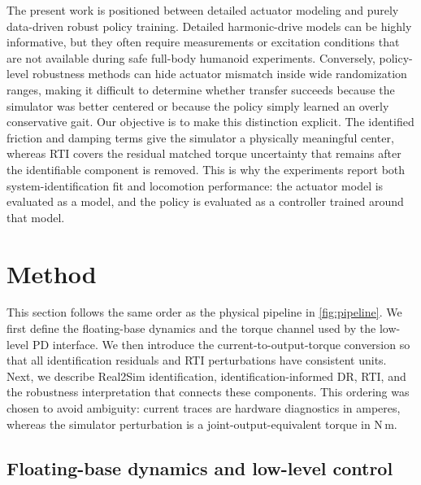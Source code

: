 \documentclass[twoside,final,1p,times]{elsarticle}
\newenvironment{revblock}{}{}
\begin{document}
\begin{revblock}
The present work is positioned between detailed actuator modeling and purely data-driven robust policy training. Detailed harmonic-drive models can be highly informative, but they often require measurements or excitation conditions that are not available during safe full-body humanoid experiments. Conversely, policy-level robustness methods can hide actuator mismatch inside wide randomization ranges, making it difficult to determine whether transfer succeeds because the simulator was better centered or because the policy simply learned an overly conservative gait. Our objective is to make this distinction explicit. The identified friction and damping terms give the simulator a physically meaningful center, whereas RTI covers the residual matched torque uncertainty that remains after the identifiable component is removed. This is why the experiments report both system-identification fit and locomotion performance: the actuator model is evaluated as a model, and the policy is evaluated as a controller trained around that model.
\end{revblock}

\section{Method}
\label{sec:method}

\begin{revblock}
This section follows the same order as the physical pipeline in \cref{fig:pipeline}. We first define the floating-base dynamics and the torque channel used by the low-level PD interface. We then introduce the current-to-output-torque conversion so that all identification residuals and RTI perturbations have consistent units. Next, we describe Real2Sim identification, identification-informed DR, RTI, and the robustness interpretation that connects these components. This ordering was chosen to avoid ambiguity: current traces are hardware diagnostics in amperes, whereas the simulator perturbation is a joint-output-equivalent torque in N\,m.
\end{revblock}

\subsection{Floating-base dynamics and low-level control}
\end{document}
